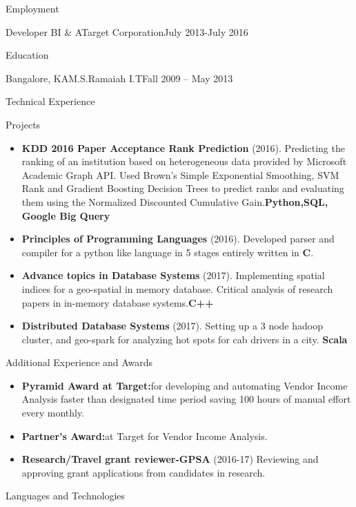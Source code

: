 \documentclass[]{nakulcv}
\begin{document}
\begin{cvsection}{Employment}
\begin{cvsubsection}{Developer BI \& A}{Target Corporation}{July 2013-July 2016}
\begin{cvsection}{Education}
\begin{cvsubsection}{Bangalore, KA}{M.S.Ramaiah I.T}{Fall 2009 -- May 2013}
\begin{itemize}
			\end{itemize}
		\end{cvsubsection}
	\end{cvsection}
	\begin{cvsection}{Technical Experience}
		\begin{cvsubsection}{Projects}{}{}
			\begin{itemize}
				\item \textbf{KDD 2016 Paper Acceptance Rank Prediction} (2016). Predicting the ranking of an institution based on heterogeneous data provided by Microsoft Academic Graph API. Used Brown's Simple Exponential Smoothing, SVM Rank and Gradient Boosting Decision Trees to predict ranks and evaluating them using the Normalized Discounted Cumulative Gain.\textbf{Python,SQL, Google Big Query} 
				\item \textbf{Principles of Programming Languages} (2016). Developed parser and compiler for a python like language in 5 stages entirely written in \textbf{C}.
				\item \textbf{Advance topics in Database Systems} (2017). Implementing spatial indices for a geo-spatial in memory database. Critical analysis of research papers in in-memory database systems.\textbf{C++}
				\item \textbf{Distributed Database Systems} (2017). Setting up a 3 node hadoop cluster, and geo-spark for analyzing hot spots for cab drivers in a city. \textbf{Scala}
			\end{itemize}
		\end{cvsubsection}
	\end{cvsection}
	\begin{cvsection}{Additional Experience and Awards}
		\begin{cvsubsection}{}{}{}	
			\begin{itemize}
				\item \textbf{Pyramid Award at Target:}for developing and automating Vendor Income Analysis faster than designated time period saving 100 hours of manual effort every monthly.
				\item \textbf{Partner's Award:}at Target for Vendor Income Analysis. 
				\item \textbf{Research/Travel grant reviewer-GPSA} (2016-17) Reviewing and approving grant applications from candidates in research. 
			\end{itemize}
		\end{cvsubsection}
	\end{cvsection}
	\begin{cvsection}{Languages and Technologies}

\end{cvsection}
\end{cvsubsection}
\end{cvsection}
\end{document}
